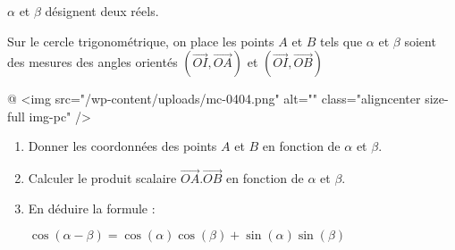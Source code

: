 
%
$\alpha $ et $\beta $ désignent deux réels.
\par
Sur le cercle trigonométrique, on place les points  $A$ et $B$ tels que $\alpha $ et $\beta $ soient des mesures des angles orientés $\left(\overrightarrow{OI}, \overrightarrow{OA}\right)$ et $\left(\overrightarrow{OI}, \overrightarrow{OB}\right)$

\begin{center}
\end{center}@
<img src="/wp-content/uploads/mc-0404.png" alt="" class="aligncenter size-full  img-pc" />
\begin{enumerate}
     \item
     Donner les coordonnées des points $A$ et $B$ en fonction de $\alpha $ et $\beta $.
     \item
     Calculer le produit scalaire $\overrightarrow{OA}.\overrightarrow{OB}$ en fonction de $\alpha $ et $\beta $.
     \item
     En déduire la formule :
     \begin{center}$\cos\left(\alpha -\beta \right)=\cos\left(\alpha \right)\cos\left(\beta \right)+\sin\left(\alpha \right)\sin\left(\beta \right)$\end{center}
\end{enumerate}

